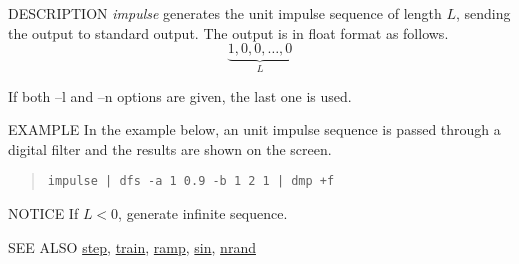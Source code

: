 \begin{synopsis}
\item[impulse] [ --l $L$ ] [ --n $N$ ]
\end{synopsis}

\begin{qsection}{DESCRIPTION}
{\em impulse} generates the unit impulse sequence of length $L$, 
sending the output to standard output. 
The output is in float format as follows.
\begin{displaymath}
\underbrace{1, 0, 0, \dots, 0}_{L}
\end{displaymath}

If both --l and --n options are given, the last one is used.
\end{qsection}

\begin{options}
\end{options}

\begin{qsection}{EXAMPLE}
In the example below, an unit impulse sequence is passed through 
a digital filter and the results are shown on the screen.
\begin{quote}
 \verb!impulse | dfs -a 1 0.9 -b 1 2 1 | dmp +f!
\end{quote}
\end{qsection}

\begin{qsection}{NOTICE}
If $L < 0$, generate infinite sequence.
\end{qsection}

\begin{qsection}{SEE ALSO}
\hyperlink{step}{step},
\hyperlink{train}{train},
\hyperlink{ramp}{ramp},
\hyperlink{sin}{sin},
\hyperlink{nrand}{nrand}
\end{qsection}
